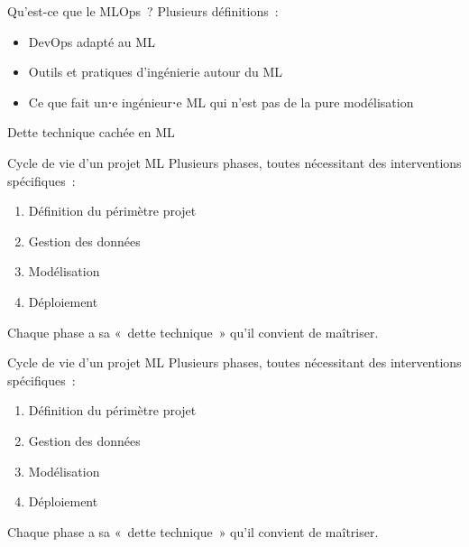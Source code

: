\begin{frame}{Qu'est-ce que le MLOps~?}
  Plusieurs définitions~:

  \begin{itemize}
    \item DevOps adapté au ML
    \item Outils et pratiques d'ingénierie autour du ML
    \item Ce que fait un⋅e ingénieur⋅e ML qui n'est pas de la pure modélisation
  \end{itemize}
\end{frame}

\begin{frame}{Dette technique cachée en ML}
\end{frame}

\begin{frame}{Cycle de vie d'un projet ML}
  Plusieurs phases, toutes nécessitant des interventions spécifiques~:

  \begin{enumerate}
    \item Définition du périmètre projet
    \item Gestion des données
    \item Modélisation
    \item Déploiement
  \end{enumerate}

  Chaque phase a sa « dette technique » qu'il convient de maîtriser.
\end{frame}

\begin{frame}{Cycle de vie d'un projet ML}
  Plusieurs phases, toutes nécessitant des interventions spécifiques~:

  \begin{enumerate}
    \item Définition du périmètre projet
    \item Gestion des données
    \item Modélisation
    \item Déploiement
  \end{enumerate}

  Chaque phase a sa « dette technique » qu'il convient de maîtriser.
\end{frame}